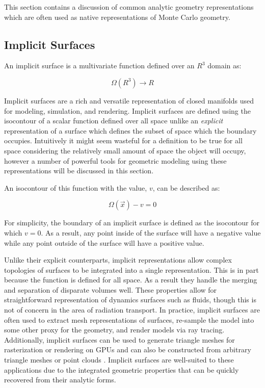 This section contains a discussion of common analytic geometry  representations
which are often used as native representations of Monte Carlo geometry.

\subsection{Implicit Surfaces}\label{subsec:implicit_surfaces}

An implicit surface is a multivariate function defined over an $ R^3 $ domain as:

\begin{equation}
    \Omega(R^3)\rightarrow R
\end{equation}

Implicit surfaces are a rich and versatile representation of closed manifolds
used for modeling, simulation, and rendering. Implicit surfaces are defined
using the isocontour of a scalar function defined over all space unlike an
\textit{explicit} representation of a surface which defines the subset of space
which the boundary occupies. Intuitively it might seem wasteful for a definition
to be true for all space considering the relatively small amount of space the
object will occupy, however a number of powerful tools for geometric modeling
using these representations will be discussed in this section.

An isocontour of this function with the value, $v$, can be described as:

\begin{equation}
  \Omega(\vec{x}) - v  = 0 
\end{equation}

For simplicity, the boundary of an implicit surface is defined as the isocontour
for which $v=0$. As a result, any point inside of the surface will have a negative value
while any point outside of the surface will have a positive value.

Unlike their explicit counterparts, implicit representations allow complex
topologies of surfaces to be integrated into a single representation. This is in
part because the function is defined for all space. As a result they handle the
merging and separation of disparate volumes well. These properties allow for
straightforward representation of dynamics surfaces such as fluids, though this
is not of concern in the area of radiation transport. In practice, implicit
surfaces are often used to extract mesh representations of surfaces, re-sample
the model into some other proxy for the geometry, and render models via ray
tracing. Additionally, implicit surfaces can be used to generate triangle meshes
for rasterization or rendering on GPUs \cite{Sethian_1996} and can also be
constructed from arbitrary triangle meshes or point clouds
\cite{Sigg_2006}. Implicit surfaces are well-suited to these applications due to
the integrated geometric properties that can be quickly recovered from their
analytic forms.

